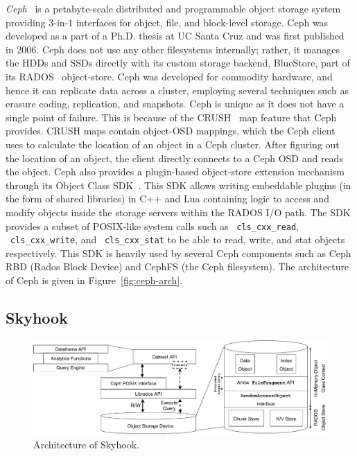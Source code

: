 \documentclass[11pt]{article}
\newcommand{\code}[1]{\colorbox{light-gray}{\texttt{#1}}}
\begin{document}
\textit{Ceph}~\cite{weil2006ceph} is a petabyte-scale distributed and programmable object storage system providing $3$-in-$1$ interfaces for object, file, and block-level storage. Ceph was developed as a part of a Ph.D. thesis at UC Santa Cruz and was first published in 2006. Ceph does not use any other filesystems internally; rather, it manages the HDDs and SSDs directly with its custom storage backend, BlueStore, part of its RADOS~\cite{weil2007rados} object-store. Ceph was developed for commodity hardware, and hence it can replicate data across a cluster, employing several techniques such as erasure coding, replication, and snapshots. Ceph is unique as it does not have a single point of failure. This is because of the CRUSH~\cite{weil2006crush} map feature that Ceph provides. CRUSH maps contain object-OSD mappings, which the Ceph client uses to calculate the location of an object in a Ceph cluster. After figuring out the location of an object, the client directly connects to a Ceph OSD and reads the object. Ceph also provides a plugin-based object-store extension mechanism through its Object Class SDK~\cite{objectclasssdk}. This SDK allows writing embeddable plugins (in the form of shared libraries) in C++ and Lua containing logic to access and modify objects inside the storage servers within the RADOS I/O path. The SDK provides a subset of POSIX-like system calls such as ~\code{cls\_cxx\_read}, ~\code{cls\_cxx\_write}, and ~\code{cls\_cxx\_stat} to be able to read, write, and stat objects respectively. This SDK is heavily used by several Ceph components such as Ceph RBD (Rados Block Device) and CephFS (the Ceph filesystem). The architecture of Ceph is given in Figure~\ref{fig:ceph-arch}.

\subsection{Skyhook}
\begin{figure}[h]
\centering
\includegraphics[width=\textwidth]{figs/implarch.pdf}
\caption{Architecture of Skyhook.}
\label{fig:skyhook-arch}
\end{figure}
\end{document}
